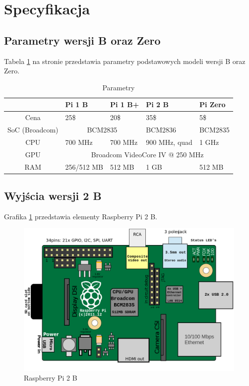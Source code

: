 \documentclass[titlepage]{article}
\begin{document}
\newpage



\section{Specyfikacja}
\subsection{Parametry wersji B oraz Zero}
Tabela \ref{table:parametry} na stronie \pageref{table:parametry} przedstawia parametry podstawowych modeli wersji B oraz Zero.

\begin{table}[!htb]
\begin{center}
\begin{tabular}{|c||l|l|l|l|}
\hline  & Pi 1 B & Pi 1 B+ & Pi 2 B & Pi Zero \\ \hline \hline
Cena & 25\$ & 20\$ & 35\$ & 5\$ \\ \hline
SoC (Broadcom) & \multicolumn{2}{c|}{BCM2835} & BCM2836 & BCM2835 \\ \hline
CPU & 700 MHz & 700 MHz & 900 MHz, quad & 1 GHz\\ \hline
GPU & \multicolumn{4}{c|}{Broadcom VideoCore IV @ 250 MHz}  \\ \hline
RAM & 256/512 MB & 512 MB & 1 GB & 512 MB \\ \hline
\end{tabular}
\caption{Parametry}
\label{table:parametry}
\end{center}
\end{table}

\subsection{Wyjścia wersji 2 B}
Grafika \ref{pic:rpi2b} przedstawia elementy Raspberry Pi 2 B.\cite{wiki}

\begin{figure}[!htb]
	\includegraphics[scale=0.25]{pi2b_schema.png}
	\caption{Raspberry Pi 2 B}
	\label{pic:rpi2b}
\end{figure}
\end{document}
